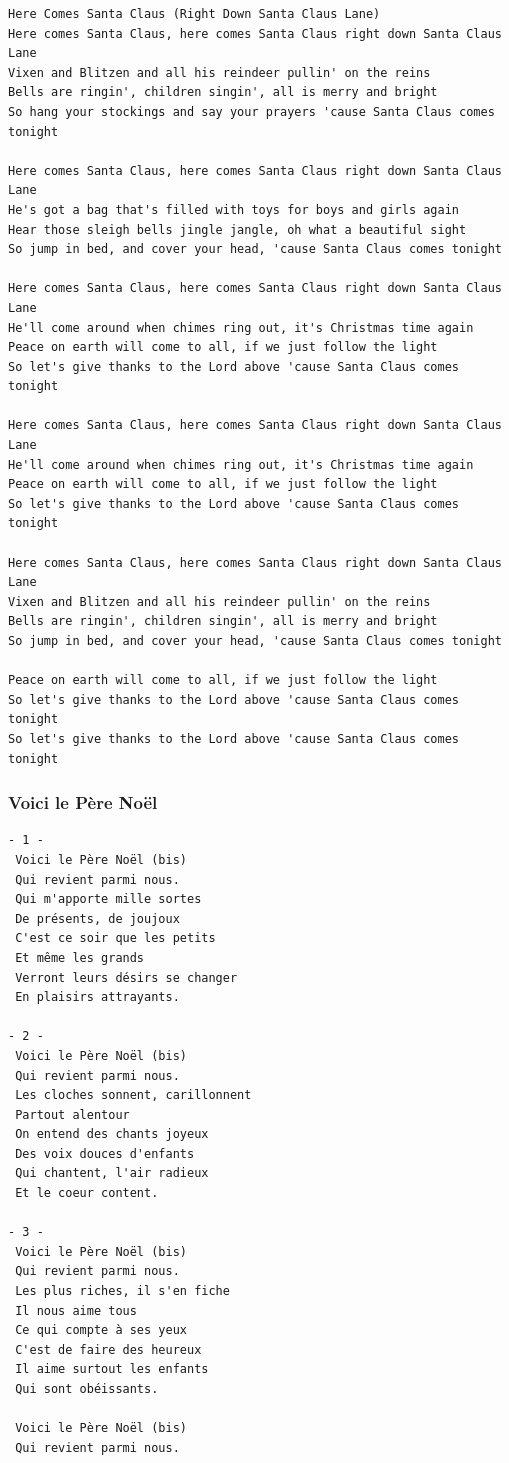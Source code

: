 \documentclass[
]{article}
\begin{document}
\begin{verbatim}
Here Comes Santa Claus (Right Down Santa Claus Lane)
Here comes Santa Claus, here comes Santa Claus right down Santa Claus Lane
Vixen and Blitzen and all his reindeer pullin' on the reins
Bells are ringin', children singin', all is merry and bright
So hang your stockings and say your prayers 'cause Santa Claus comes tonight

Here comes Santa Claus, here comes Santa Claus right down Santa Claus Lane
He's got a bag that's filled with toys for boys and girls again
Hear those sleigh bells jingle jangle, oh what a beautiful sight
So jump in bed, and cover your head, 'cause Santa Claus comes tonight

Here comes Santa Claus, here comes Santa Claus right down Santa Claus Lane
He'll come around when chimes ring out, it's Christmas time again
Peace on earth will come to all, if we just follow the light
So let's give thanks to the Lord above 'cause Santa Claus comes tonight

Here comes Santa Claus, here comes Santa Claus right down Santa Claus Lane
He'll come around when chimes ring out, it's Christmas time again
Peace on earth will come to all, if we just follow the light
So let's give thanks to the Lord above 'cause Santa Claus comes tonight

Here comes Santa Claus, here comes Santa Claus right down Santa Claus Lane
Vixen and Blitzen and all his reindeer pullin' on the reins
Bells are ringin', children singin', all is merry and bright
So jump in bed, and cover your head, 'cause Santa Claus comes tonight

Peace on earth will come to all, if we just follow the light    
So let's give thanks to the Lord above 'cause Santa Claus comes tonight
So let's give thanks to the Lord above 'cause Santa Claus comes tonight
\end{verbatim}

\hypertarget{voici-le-puxe8re-nouxebl}{%
\subsubsection*{Voici le Père Noël}\label{voici-le-puxe8re-nouxebl}}

\begin{verbatim}
- 1 -
 Voici le Père Noël (bis)
 Qui revient parmi nous. 
 Qui m'apporte mille sortes
 De présents, de joujoux
 C'est ce soir que les petits
 Et même les grands
 Verront leurs désirs se changer
 En plaisirs attrayants. 

- 2 -
 Voici le Père Noël (bis)
 Qui revient parmi nous. 
 Les cloches sonnent, carillonnent
 Partout alentour
 On entend des chants joyeux
 Des voix douces d'enfants
 Qui chantent, l'air radieux 
 Et le coeur content. 

- 3 -
 Voici le Père Noël (bis)
 Qui revient parmi nous. 
 Les plus riches, il s'en fiche
 Il nous aime tous
 Ce qui compte à ses yeux
 C'est de faire des heureux
 Il aime surtout les enfants
 Qui sont obéissants. 

 Voici le Père Noël (bis)
 Qui revient parmi nous.
\end{verbatim}
\end{document}

